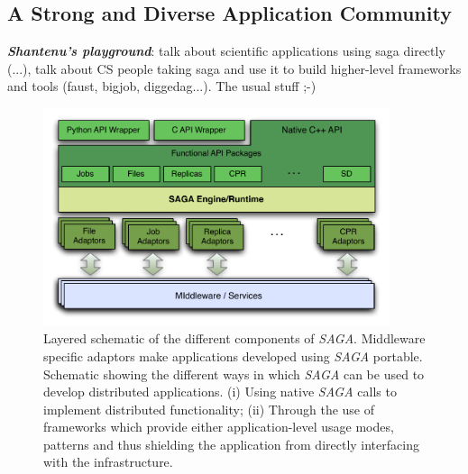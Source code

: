 \documentclass[a4paper,10pt]{article}
\newcommand{\BI}[1]{\textbf{\textit{#1}}}
\newcommand{\sagaimpl}{\textit{SAGA}\xspace}
\newcommand{\impl}{\sagaimpl}
\begin{document}
\subsection*{A Strong and Diverse Application Community}
\BI{Shantenu's playground}: talk about scientific applications using saga directly (...), talk about CS people taking saga and use it to build higher-level frameworks and tools (faust, bigjob, diggedag...). The usual stuff ;-)
 
 \pagebreak
 

\begin{figure}[hb]
  \centering
  \includegraphics[width=4in]{./figures/figure_01}
 \vspace{-1em}	
  \caption{\footnotesize Layered schematic of the different
    components of \impl.  Middleware specific adaptors make
    applications developed using \impl portable.  Schematic showing
    the different ways in which \impl can be used to develop
    distributed applications. (i) Using native \impl calls to
    implement distributed functionality; (ii) Through the use of
    frameworks which provide either application-level usage modes,
    patterns and thus shielding the application from directly
    interfacing with the infrastructure.}
  \label{fig:saga_arch}
\end{figure}

  
 
\end{document}
